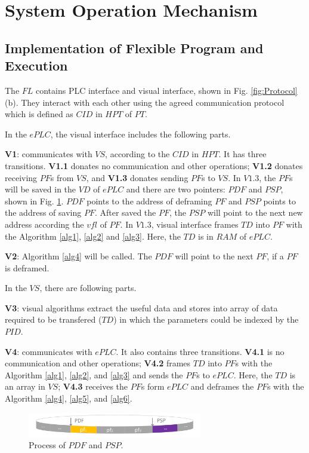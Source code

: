 \documentclass[journal,UTF8]{IEEEtran}
\begin{document}
\section{System Operation Mechanism}
\label{Execution}
\subsection{Implementation of Flexible Program and Execution}
The $FL$ contains PLC interface and visual interface, shown in Fig. \ref{fig:Protocol} (b).
They interact with each other using the agreed communication protocol which is defined as $CID$ in $HPT$ of $PT$. 

In the $ePLC$, the visual interface includes the following parts.

\textbf{V1}: communicates with $VS$, according to the $CID$ in $HPT$. It has three transitions. \textbf{V1.1} donates no communication and other operations; \textbf{V1.2} donates receiving $PF$s from $VS$, and \textbf{V1.3} donates sending $PF$s to $VS$. In $V1.3$, the $PF$s will be saved in the $VD$ of $ePLC$ and there are two pointers: $PDF$ and $PSP$, shown in Fig. \ref{fig:VisualInterface}. $PDF$ points to the address of deframing $PF$ and $PSP$ points to the address of saving $PF$. After saved the $PF$, the $PSP$ will point to the next new address according the $vfl$ of $PF$. In $V1.3$, visual interface frames $TD$ into $PF$ with the Algorithm \ref{alg1}, \ref{alg2} and \ref{alg3}. Here, the $TD$ is in $RAM$ of $ePLC$.

\textbf{V2}: Algorithm \ref{alg4} will be called. The $PDF$ will point to the next $PF$, if a $PF$ is deframed.


In the $VS$, there are following parts.  

\textbf{V3}: visual algorithms extract the useful data and stores into array of data required to be transfered ($TD$) in which the parameters could be indexed by the $PID$.

\textbf{V4}: communicates with $ePLC$. It also contains three transitions. \textbf{V4.1} is no communication and other operations; \textbf{V4.2} frames $TD$ into $PF$s with the Algorithm \ref{alg1}, \ref{alg2}, and \ref{alg3} and sends the $PF$s to $ePLC$. Here, the $TD$ is an array in $VS$; \textbf{V4.3} receives the $PF$s form $ePLC$ and deframes the $PF$s with the Algorithm \ref{alg4}, \ref{alg5}, and \ref{alg6}.

\begin{figure}
	\centering
	\includegraphics[width=3in]{fig/VisualInterface.pdf}
	\caption{ Process of $PDF$ and $PSP$. 
}
	\label{fig:VisualInterface}
\end{figure}
\end{document}

